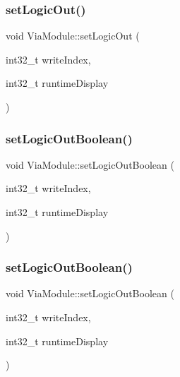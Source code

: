 \mbox{\label{class_via_module_a980dceea193632fc47c663dc2adcf7ca}} 
\subsubsection{\texorpdfstring{set\+Logic\+Out()}{setLogicOut()}\hspace{0.1cm}{\footnotesize\ttfamily [2/2]}}
{\footnotesize\ttfamily void Via\+Module\+::set\+Logic\+Out (\begin{DoxyParamCaption}\item[{int32\+\_\+t}]{write\+Index,  }\item[{int32\+\_\+t}]{runtime\+Display }\end{DoxyParamCaption})\hspace{0.3cm}{\ttfamily [inline]}}

\mbox{\label{class_via_module_ad7dd37cc52066d45418818743b3d23ad}} 
\subsubsection{\texorpdfstring{set\+Logic\+Out\+Boolean()}{setLogicOutBoolean()}\hspace{0.1cm}{\footnotesize\ttfamily [1/2]}}
{\footnotesize\ttfamily void Via\+Module\+::set\+Logic\+Out\+Boolean (\begin{DoxyParamCaption}\item[{int32\+\_\+t}]{write\+Index,  }\item[{int32\+\_\+t}]{runtime\+Display }\end{DoxyParamCaption})\hspace{0.3cm}{\ttfamily [inline]}}

\mbox{\label{class_via_module_ad7dd37cc52066d45418818743b3d23ad}} 
\subsubsection{\texorpdfstring{set\+Logic\+Out\+Boolean()}{setLogicOutBoolean()}\hspace{0.1cm}{\footnotesize\ttfamily [2/2]}}
{\footnotesize\ttfamily void Via\+Module\+::set\+Logic\+Out\+Boolean (\begin{DoxyParamCaption}\item[{int32\+\_\+t}]{write\+Index,  }\item[{int32\+\_\+t}]{runtime\+Display }\end{DoxyParamCaption})\hspace{0.3cm}{\ttfamily [inline]}}

